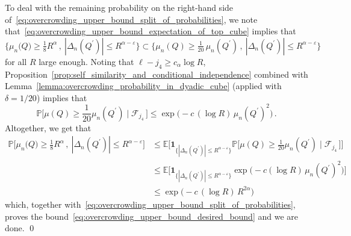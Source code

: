 \documentclass[11pt]{amsart}
\theoremstyle{definition}
\theoremstyle{remark}
\numberwithin{equation}{section}
\def\eps{{\varepsilon}}
\newcommand{\bP}{\mathbb P}
\newcommand{\bE}{\mathbb E}
\begin{document}
	To deal with the remaining probability on the right-hand side of~\eqref{eq:overcrowding_upper_bound_split_of_probabilities}, we note that~\eqref{eq:overcrowding_upper_bound_expectation_of_top_cube} implies that
	\[
	\Big\{\mu_n\big(Q\big) \ge \tfrac{1}{8} R^\alpha \, , \ |\Delta_{n}(Q^\prime)| \le R^{\alpha-\eps}\Big\} \subset \Big\{ \mu_n(Q) \ge \tfrac{1}{20}\, \mu_n(Q^\prime) \, , \  |\Delta_n(Q^\prime)| \le R^{\alpha-\eps} \Big\}
	\]
	for all $R$ large enough. Noting that $\ell - j_4 \ge c_\alpha \log R$, Proposition~\ref{prop:self_similarity_and_conditional_independence} combined with Lemma~\ref{lemma:overcrowding_probability_in_dyadic_cube} (applied with $\delta=1/20$) implies that
	\[
	\bP\Big[\mu(Q) \ge \frac{1}{20} \mu_n(Q^\prime) \mid \mathcal{F}_{j_4} \, \Big] \le \exp\Big(-c \, (\log R) \, \mu_n(Q^\prime)^2 \Big)\, .
	\]
	Altogether, we get that
	\begin{align*}
		\bP\Big[\mu_n\big(Q\big) \ge \tfrac{1}{8} R^\alpha \, , \ |\Delta_{n}(Q^\prime)| \le R^{\alpha-\eps}\Big]  &\le \bE\Big[\mathbf{1}_{\{|\Delta_{n}(Q^\prime)| \le R^{\alpha-\eps} \}} \bP\big[\mu(Q) \ge \tfrac{1}{20} \mu_n(Q^\prime) \mid \mathcal{F}_{j_4} \, \big]\Big] \\ &\le \bE\Big[\mathbf{1}_{\{|\Delta_{n}(Q^\prime)| \le R^{\alpha-\eps} \}} \exp\Big(-c(\log R) \, \mu_n(Q^\prime)^2 \Big)\Big]  \\ &\le \exp\Big(-c \, (\log R)\, R^{2\alpha}\Big) 
	\end{align*}
	which, together with~\eqref{eq:overcrowding_upper_bound_split_of_probabilities}, proves the bound~\eqref{eq:overcrowding_upper_bound_desired_bound} and we are done.
	\qed
\end{document}
